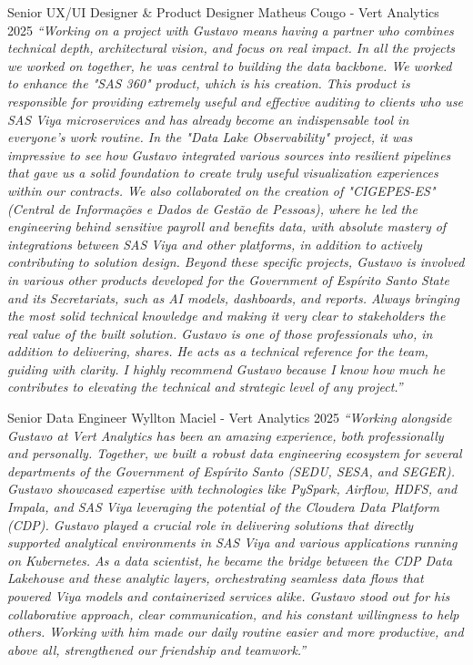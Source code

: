\begin{cventries}
  \cventry
    {Senior UX/UI Designer \& Product Designer} %
    {Matheus Cougo - Vert Analytics} %
    {2025} %
    {} %
    {
      \textit{``Working on a project with Gustavo means having a partner who combines technical depth, architectural vision, and focus on real impact. In all the projects we worked on together, he was central to building the data backbone. We worked to enhance the "SAS 360" product, which is his creation. This product is responsible for providing extremely useful and effective auditing to clients who use SAS Viya microservices and has already become an indispensable tool in everyone's work routine. In the "Data Lake Observability" project, it was impressive to see how Gustavo integrated various sources into resilient pipelines that gave us a solid foundation to create truly useful visualization experiences within our contracts. We also collaborated on the creation of "CIGEPES-ES" (Central de Informações e Dados de Gestão de Pessoas), where he led the engineering behind sensitive payroll and benefits data, with absolute mastery of integrations between SAS Viya and other platforms, in addition to actively contributing to solution design. Beyond these specific projects, Gustavo is involved in various other products developed for the Government of Espírito Santo State and its Secretariats, such as AI models, dashboards, and reports. Always bringing the most solid technical knowledge and making it very clear to stakeholders the real value of the built solution. Gustavo is one of those professionals who, in addition to delivering, shares. He acts as a technical reference for the team, guiding with clarity. I highly recommend Gustavo because I know how much he contributes to elevating the technical and strategic level of any project.''}
    }

  \cventry
    {Senior Data Engineer} %
    {Wyllton Maciel - Vert Analytics} %
    {2025} %
    {} %
    {
      \textit{``Working alongside Gustavo at Vert Analytics has been an amazing experience, both professionally and personally. Together, we built a robust data engineering ecosystem for several departments of the Government of Espírito Santo (SEDU, SESA, and SEGER). Gustavo showcased expertise with technologies like PySpark, Airflow, HDFS, and Impala, and SAS Viya leveraging the potential of the Cloudera Data Platform (CDP). Gustavo played a crucial role in delivering solutions that directly supported analytical environments in SAS Viya and various applications running on Kubernetes. As a data scientist, he became the bridge between the CDP Data Lakehouse and these analytic layers, orchestrating seamless data flows that powered Viya models and containerized services alike. Gustavo stood out for his collaborative approach, clear communication, and his constant willingness to help others. Working with him made our daily routine easier and more productive, and above all, strengthened our friendship and teamwork.''}
    }


\end{cventries}
